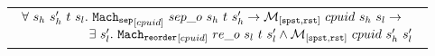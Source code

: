\begin{lemma}
\begin{tabular}{P{0.95\textwidth}}
$
\begin{array}{l}
\forall \ s_h \ s_h' \ t \ s_l . \ \singleseparatestep{cpuid}{sep\_o}{s_h}{t}{s_h'} \rightarrow  \matchspstaterstate{cpuid}{s_h}{s_l} \rightarrow \\
\ \ \ \ \ \ \ \ \ \ \ \ \ \ \ \ \exists\ s_l' . \  \singlereorderstep{cpuid}{re\_o}{s_l}{t}{s_l'} \wedge  \matchspstaterstate{cpuid}{s_h'}{s_l'}\\
\end{array}
$
\end{tabular}
\end{lemma}
